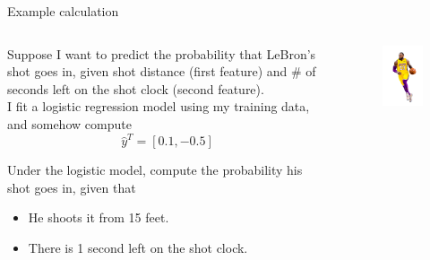 \documentclass[aspectratio=169]{../latex_main/tntbeamer}  %
\begin{document}
	
	\begin{frame}{Example calculation}
	   
	   \begin{columns}
	    
	   \begin{column}{.5\textwidth}
	    Suppose I want to predict the probability that LeBron’s shot goes in, given shot distance (first feature) and \# of seconds left on the shot clock (second feature).\\
	    \bigskip
	    I fit a logistic regression model using my training data, and somehow compute
	    \begin{equation*}
	        \hat{y}^T = [0.1 , -0.5]
	    \end{equation*}
	    
	   Under the logistic model, compute the probability his shot goes in, given that
	    \begin{itemize}
	        \item He shoots it from 15 feet.
	        \item There is 1 second left on the shot clock.
	    \end{itemize}
	    \end{column}
	    \begin{column}{.5\textwidth}
	        \begin{figure}
	            \centering
	            \includegraphics[scale=.9]{Bild7}
	        \end{figure}
	    \end{column}
	    
	    \end{columns}
	\end{frame}
	
\end{document}
